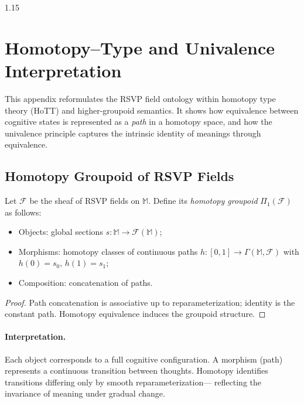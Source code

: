 \documentclass[12pt,a4paper]{article}
\begin{document}
\begin{spacing}{1.15}
\section{Homotopy–Type and Univalence Interpretation}
\label{app:homotopy}

This appendix reformulates the RSVP field ontology
within homotopy type theory (HoTT) and higher-groupoid semantics.
It shows how equivalence between cognitive states
is represented as a \emph{path} in a homotopy space,
and how the univalence principle captures
the intrinsic identity of meanings through equivalence.

\subsection{Homotopy Groupoid of RSVP Fields}

\begin{definition}
\label{def:hgrp}
Let \(\mathscr{F}\) be the sheaf of RSVP fields on \(\mathbb{M}\).
Define its \emph{homotopy groupoid} \(\Pi_1(\mathscr{F})\) as follows:
\begin{itemize}[leftmargin=1.2em]
  \item Objects: global sections \(s:\mathbb{M}\to\mathscr{F}(\mathbb{M})\);
  \item Morphisms: homotopy classes of continuous paths
        \(h:[0,1]\to\Gamma(\mathbb{M},\mathscr{F})\)
        with \(h(0)=s_0,\,h(1)=s_1\);
  \item Composition: concatenation of paths.
\end{itemize}
\end{definition}

\begin{proof}
Path concatenation is associative up to reparameterization;
identity is the constant path.
Homotopy equivalence induces the groupoid structure.
\end{proof}

\paragraph{Interpretation.}
Each object corresponds to a full cognitive configuration.
A morphism (path) represents a continuous transition between thoughts.
Homotopy identifies transitions differing only by smooth reparameterization—
reflecting the invariance of meaning under gradual change.


\end{spacing}
\end{document}
